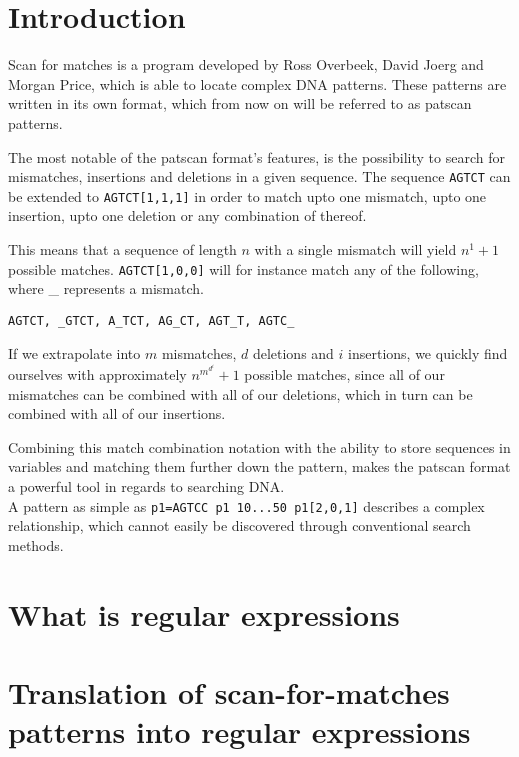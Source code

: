 \documentclass[12pt]{article}
\begin{document}
\newpage

\section{Introduction}

Scan for matches is a program developed by Ross Overbeek, David Joerg and Morgan Price, which is able to locate complex DNA patterns. These patterns are written in its own format, which from now on will be referred to as patscan patterns.\cite{scan-for-matches}

The most notable of the patscan format's features, is the possibility to search for mismatches, insertions and deletions in a given sequence. The sequence \texttt{AGTCT} can be extended to \texttt{AGTCT[1,1,1]} in order to match upto one mismatch, upto one insertion, upto one deletion or any combination of thereof.

This means that a sequence of length $n$ with a single mismatch will yield $n^1+1$ possible matches. \texttt{AGTCT[1,0,0]} will for instance match any of the following, where \_ represents a mismatch.

\texttt{AGTCT, \_GTCT, A\_TCT, AG\_CT, AGT\_T, AGTC\_}

If we extrapolate into $m$ mismatches, $d$ deletions and $i$ insertions, we quickly find ourselves with approximately  $n^{m^{d^{i}}}+1$ possible matches, since all of our mismatches can be combined with all of our deletions, which in turn can be combined with all of our insertions.

Combining this match combination notation with the ability to store sequences in variables and matching them further down the pattern, makes the patscan format a powerful tool in regards to searching DNA. \\
A pattern as simple as \texttt{p1=AGTCC p1 10...50 p1[2,0,1]} describes a complex relationship, which cannot easily be discovered through conventional search methods.

\newpage

\section{What is regular expressions}

\newpage

\section{Translation of scan-for-matches patterns into regular expressions}
\end{document}
